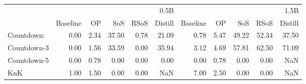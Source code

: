 \begin{tabular}{lrrrrrrrrrr}
\toprule
 & \multicolumn{5}{r}{0.5B} & \multicolumn{5}{r}{1.5B} \\
 & Baseline & OP & SoS & RSoS & Distill & Baseline & OP & SoS & RSoS & Distill \\
\midrule
Countdown: & 0.00 & 2.34 & 37.50 & 0.78 & 21.09 & 0.78 & 5.47 & 49.22 & 52.34 & 37.50 \\
Countdown-3 & 0.00 & 1.56 & 33.59 & 0.00 & 35.94 & 3.12 & 4.69 & 57.81 & 62.50 & 71.09 \\
Countdown-5 & 0.00 & 0.78 & 0.00 & 0.00 & 0.00 & 0.00 & 0.78 & 0.00 & 0.00 & NaN \\
KnK & 1.00 & 1.50 & 0.00 & 0.00 & NaN & 7.00 & 2.50 & 0.00 & 0.00 & NaN \\
\bottomrule
\end{tabular}
